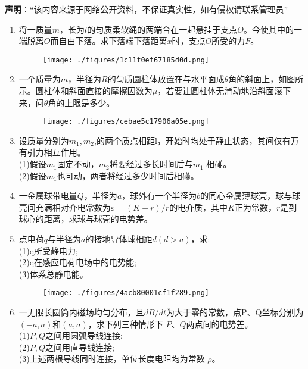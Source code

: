 

\textbf{声明}：“该内容来源于网络公开资料，不保证真实性，如有侵权请联系管理员”

\begin{enumerate}
\item 将一质量$m$，长为$l$的匀质柔软绳的两端合在一起悬挂于支点$O$。今使其中的一端脱离$O$而自由下落。求下落端下落距离$x$时，支点$O$所受的力$F$。
\begin{figure}[ht]
\centering
\texttt{[image: ./figures/1c11f0ef67185d0d.png]}
\caption{} \label{fig_ZKD14_1}
\end{figure}
\item 一个质量为$m$，半径为$R$的匀质圆柱体放置在与水平面成$\theta$角的斜面上，如图所示。圆柱体和斜面直接的摩擦因数为$\mu$，若要让圆柱体无滑动地沿斜面滚下来，问$\theta$角的上限是多少。
\begin{figure}[ht]
\centering
\texttt{[image: ./figures/cebae5c17906a05e.png]}
\caption{} \label{fig_ZKD14_2}
\end{figure}
\item 设质量分别为$m_1,m_2$,的两个质点相距l，开始时均处于静止状态，其间仅有万有引力相互作用。\\
(1)假设$m_1$固定不动，$m_2$将要经过多长时间后与$m_1$ 相碰。\\
(2)假设$m_1$也可动，两者将经过多少时间后相碰。
\item 一金属球带电量$Q$，半径为$a$，球外有一个半径为$b$的同心金属薄球壳，球与球壳间充满相对介电常数为$\varepsilon=(K+r)/r$的电介质，其中$K$正为常数，$r$是到球心的距离，求球与球壳的电势差。
\item 点电荷$q$与半径为$a$的接地导体球相距$d(d>a)$，求:\\
(1)q所受静电力;\\
(2)q在感应电荷电场中的电势能;\\
(3)体系总静电能。
\begin{figure}[ht]
\centering
\texttt{[image: ./figures/4acb80001cf1f289.png]}
\caption{} \label{fig_ZKD14_3}
\end{figure}
\item 一无限长圆筒内磁场均匀分布，且$dB/dt$为大于零的常数，点P、Q坐标分别为$(-a,a)$和$(a,a)$，求下列三种情形下 $P$、$Q$两点间的电势差。\\
(1)$P,Q$之间用圆弧导线连接;\\
(2)$P,Q$之间用直导线连接;\\
(3)上述两根导线同时连接，单位长度电阻均为常数 $\rho$。

\end{enumerate}
